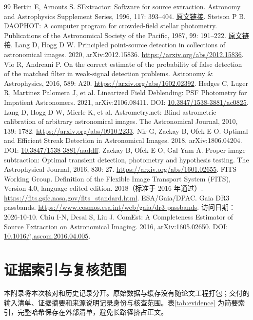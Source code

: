 \documentclass[UTF8,a4paper,11pt,fontset=windows]{ctexart}
\begin{document}
\begingroup\linespread{1.05}\selectfont
\begin{thebibliography}{99}\small
{} Bertin E, Arnouts S. SExtractor: Software for source extraction. Astronomy and Astrophysics Supplement Series, 1996, 117: 393--404. \href{https://aas.aanda.org/articles/aas/pdf/1996/08/ds1060.pdf}{原文链接}.
 Stetson P B. DAOPHOT: A computer program for crowded-field stellar photometry. Publications of the Astronomical Society of the Pacific, 1987, 99: 191--222. \href{https://articles.adsabs.harvard.edu/pdf/1987PASP...99..191S}{原文链接}.
 Lang D, Hogg D W. Principled point-source detection in collections of astronomical images. 2020, arXiv:2012.15836. \url{https://arxiv.org/abs/2012.15836}.
 Vio R, Andreani P. On the correct estimate of the probability of false detection of the matched filter in weak-signal detection problems. Astronomy \& Astrophysics, 2016, 589: A20. \url{https://arxiv.org/abs/1602.02392}.
 Hedges C, Luger R, Martinez Palomera J, et al. Linearized Field Deblending: PSF Photometry for Impatient Astronomers. 2021, arXiv:2106.08411. DOI: \href{https://doi.org/10.3847/1538-3881/ac0825}{10.3847/1538-3881/ac0825}.
 Lang D, Hogg D W, Mierle K, et al. Astrometry.net: Blind astrometric calibration of arbitrary astronomical images. The Astronomical Journal, 2010, 139: 1782. \url{https://arxiv.org/abs/0910.2233}.
 Nir G, Zackay B, Ofek E O. Optimal and Efficient Streak Detection in Astronomical Images. 2018, arXiv:1806.04204. DOI: \href{https://doi.org/10.3847/1538-3881/aaddff}{10.3847/1538-3881/aaddff}.
 Zackay B, Ofek E O, Gal-Yam A. Proper image subtraction: Optimal transient detection, photometry and hypothesis testing. The Astrophysical Journal, 2016, 830: 27. \url{https://arxiv.org/abs/1601.02655}.
 FITS Working Group. Definition of the Flexible Image Transport System (FITS), Version 4.0, language-edited edition. 2018（标准于 2016 年通过）. \url{https://fits.gsfc.nasa.gov/fits_standard.html}.
 ESA/Gaia/DPAC. Gaia DR3 passbands. \url{https://www.cosmos.esa.int/web/gaia/dr3-passbands}. 访问日期：2026-10-10.
 Chiu I-N, Desai S, Liu J. ComEst: A Completeness Estimator of Source Extraction on Astronomical Imaging. 2016, arXiv:1605.02650. DOI: \href{https://doi.org/10.1016/j.ascom.2016.04.005}{10.1016/j.ascom.2016.04.005}.
\end{thebibliography}
\endgroup

\clearpage\appendix
\section{证据索引与复核范围}
本附录将本次核对和历史记录分开。原始数据与缓存没有随论文工程打包；交付的输入清单、证据摘要和来源说明记录身份与核查范围。表\ref{tab:evidence} 为简要索引，完整哈希保存在外部清单，避免长路径挤占正文。
\end{document}
